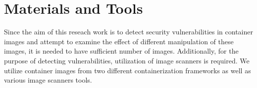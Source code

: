\documentclass[a4paper,num-refs]{oup-contemporary}
\begin{document}

\section{Materials and Tools}

Since the aim of this reseach work is to detect security vulnerabilities
in container images and attempt to examine the effect of different
manipulation of these images, it is needed to have sufficient number of
images. Additionally, for the purpose of detecting vulnerabilities,
utilization of image scanners is required. We utilize container
images from two different containerization frameworks as well as
various image scanners tools.

%

\end{document}
